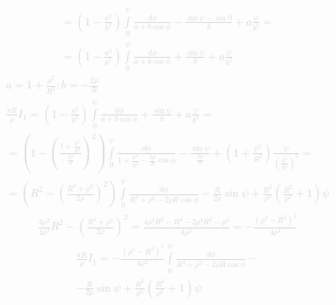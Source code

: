 %
\textcolor{lightgray}{ \begin{equation*} \begin{aligned}
= \left( 1 - \frac{a^2}{b^2} \right)
\int\limits_{0}^{\psi} \frac{d \phi}{a + b \cos \phi} -
\frac{\sin \psi - \sin 0}{b} + a \frac{\psi}{b^2} = \\
= \left( 1 - \frac{a^2}{b^2} \right)
\int\limits_{0}^{\psi} \frac{d \phi}{a + b \cos \phi} +
\frac{\sin \psi}{b} + a \frac{\psi}{b^2}
\end{aligned} \end{equation*} }
%
\textcolor{lightgray}{ \begin{equation*} \begin{aligned}
a = 1 + \frac{\rho^2}{R^2}; b = - \frac{2 \rho}{ R } \\
\frac{\pi R}{\rho} I_1 = \left( 1 - \frac{a^2}{b^2} \right)
\int\limits_{0}^{\psi} \frac{d \phi}{a + b \cos \phi} +
\frac{\sin \psi}{b} + a \frac{\psi}{b^2} = \\
= \left( 1 - \left( \frac{1 + \frac{\rho^2}{R^2}} 
{ \frac{2 \rho}{R} } \right)^2 \right) 
\int \limits_{0}^{\psi} \frac{d \phi}{1 + \frac{\rho^2}{R^2} -  
\frac{2 \rho}{R} \cos \phi} -
\frac{\sin \psi}{\frac{2 \rho}{ R }} + \left( 1 + \frac{\rho^2}{R^2} \right) 
\frac{\psi}{\left( \frac{\rho^2}{R^2} \right)^2} = \\
= \left( R^2 - \left( \frac{R^2 + \rho^2} 
{2 \rho} \right)^2 \right) 
\int \limits_{0}^{\psi} \frac{d \phi}{R^2 + \rho^2 - 2 \rho R \cos \phi} -
\frac{R}{2 \rho} \sin \psi + \frac{R^2}{\rho^2} 
\left( \frac{R^2}{\rho^2} + 1 \right) \psi  
\end{aligned} \end{equation*} }
%
\textcolor{lightgray}{ \begin{equation*} \begin{aligned}
\frac{4 \rho^2}{4 \rho^2} R^2 - \left( \frac{R^2 + \rho^2}{2 \rho} \right)^2 =
\frac{4 \rho^2 R^2 - R^4 - 2 \rho^2 R^2 - \rho^4}{4 \rho^2} =
- \frac{\left( \rho^2 - R^2 \right)^2}{4 \rho^2} 
\end{aligned} \end{equation*} }
%
\textcolor{lightgray}{ \begin{equation*} \begin{aligned}
\frac{\pi R}{\rho} I_1 = 
- \frac{\left( \rho^2 - R^2 \right)^2}{4 \rho^2} 
\int \limits_{0}^{\psi} \frac{d \phi}{R^2 + \rho^2 - 2 \rho R \cos \phi} - \\
- \frac{R}{2 \rho} \sin \psi + \frac{R^2}{\rho^2} 
\left( \frac{R^2}{\rho^2} + 1 \right) \psi 
\end{aligned} \end{equation*} }


